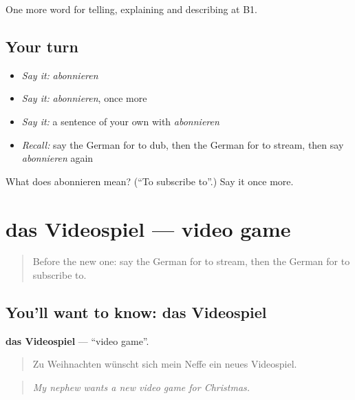 \begin{grammarlens}[title={What you've built}]
One more word for telling, explaining and describing at B1.
\end{grammarlens}

\subsection*{Your turn}
\begin{itemize}
\raggedright
  \item \emph{Say it:} \emph{abonnieren}
  \item \emph{Say it:} \emph{abonnieren}, once more
  \item \emph{Say it:} a sentence of your own with \emph{abonnieren}
  \item \emph{Recall:} say the German for to dub, then the German for to stream, then say \emph{abonnieren} again
\end{itemize}

\begin{tcolorbox}[breakable,colback=teal!4,colframe=teal!35!black,title={Before you move on}]
What does abonnieren mean? (\textquotedblleft{}To subscribe to\textquotedblright{}.) Say it once more.
\end{tcolorbox}
\section[das Videospiel]{das Videospiel — video game}

\label{lesson:GE-C525-videospiel}



\begin{quote}
Before the new one: say the German for to stream, then the German for to subscribe to.
\end{quote}

\subsection*{You'll want to know: das Videospiel}
\textbf{das Videospiel} — \textquotedblleft{}video game\textquotedblright{}.

\begin{quote}
Zu Weihnachten wünscht sich mein Neffe ein neues Videospiel.
\end{quote}

\begin{quote}
\emph{My nephew wants a new video game for Christmas.}
\end{quote}

